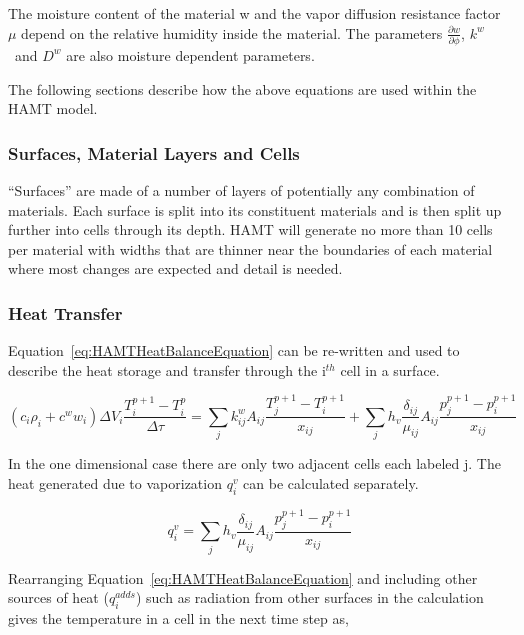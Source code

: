 The moisture content of the material w and the vapor diffusion resistance
factor $\mu$ depend on the relative humidity inside the material. The
parameters \(\frac{\partial w}{\partial \phi}\), \(k^w\) ~and \(D^w\) are
also moisture dependent parameters.

The following sections describe how the above equations are used within
the HAMT model.

\subsubsection{Surfaces, Material Layers and Cells}\label{surfaces-material-layers-and-cells}

``Surfaces'' are made of a number of layers of potentially any combination
of materials. Each surface is split into its constituent materials and is
then split up further into cells through its depth. HAMT will generate no
more than 10 cells per material with widths that are thinner near the
boundaries of each material where most changes are expected and detail is
needed.

\subsubsection{Heat Transfer}\label{heat-transfer}

Equation~\ref{eq:HAMTHeatBalanceEquation} can be re-written and used to
describe the heat storage and transfer through the i\(^{th}\) cell in a
surface.

\begin{equation}
\left( {{c_i}{\rho_i} + {c^w}{w_i}} \right)\Delta {V_i}\frac{{T_i^{p + 1} - T_i^p}}{{\Delta \tau }} = \sum\limits_j {k_{ij}^w{A_{ij}}\frac{{T_j^{p + 1} - T_i^{p + 1}}}{x_{ij}}}  + \sum\limits_j {{h_v}\frac{{{\delta_{ij}}}}{\mu_{ij}}{A_{ij}}\frac{{p_j^{p + 1} - p_i^{p + 1}}}{x_{ij}}}
\end{equation}

In the one dimensional case there are only two adjacent cells each labeled j. The heat generated due
to vaporization \(q_i^v\) can be calculated separately.

\begin{equation}
q_i^v = \sum\limits_j {{h_v}\frac{{{\delta_{ij}}}}{\mu_{ij}}{A_{ij}}\frac{{p_j^{p + 1} - p_i^{p + 1}}}{x_{ij}}}
\end{equation}

Rearranging Equation~\ref{eq:HAMTHeatBalanceEquation} and including other
sources of heat (\(q_i^{adds}\)) such as radiation from other surfaces in
the calculation gives the temperature in a cell in the next time step as,

